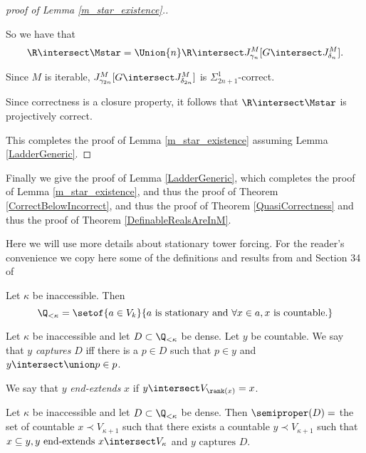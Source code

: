 \documentclass[oneside,12pt]{amsart}
\begin{document}
\begin{proof}[proof of Lemma \ref{m_star_existence}.]
\begin{subproof}
So we have that
$$\R\intersect \Mstar =  \Union{n} \R\intersect J^M_{\gamma_n}[G\intersect J^M_{\delta_n}].$$

Since $M$ is iterable, $J^M_{\gamma_{2n}}[G\intersect J^M_{\delta_{2n}}]$ is
$\Sigma^1_{2n+1}$-correct.

Since correctness is a closure property, it follows that
$\R\intersect\Mstar$ is projectively correct.
\end{subproof}


This completes the proof of Lemma \ref{m_star_existence} assuming Lemma
\ref{LadderGeneric}.

\end{proof}

Finally we give the proof of Lemma \ref{LadderGeneric}, which completes the
proof of Lemma \ref{m_star_existence}, and thus the proof of
Theorem \ref{CorrectBelowIncorrect}, and thus the proof of
Theorem \ref{QuasiCorrectness} and thus the proof of Theorem \ref{DefinableRealsAreInM}.

Here we will use more details about stationary tower forcing.
For the reader's convenience we copy here some of the definitions and results from 
\cite{Larson_Book} and Section 34 of \cite{Jech_Book2} 

\begin{definition}
Let $\kappa$ be inaccessible. Then
$$\Q_{<\kappa}=\setof{a\in V_k}{a \text{ is stationary and } \forall x \in a, x \text{ is countable.}}$$
\end{definition}


\begin{definition}
Let $\kappa$ be inaccessible and let $D\subset\Q_{<\kappa}$ be dense. Let $y$ be countable.
We say that $y$ \emph{captures} $D$ iff there is a $p\in D$ such that $p\in y$ and $y\intersect\union p \in p$.
\end{definition}

\begin{definition}
We say that $y$ \emph{end-extends} $x$ if $y\intersect V_{\rank(x)} = x$.
\end{definition}

\begin{definition}
Let $\kappa$ be inaccessible and let $D\subset\Q_{<\kappa}$ be dense. Then $\semiproper(D) = $ the set of countable
$x \prec V_{\kappa+1}$ such that there exists a countable
 $y \prec V_{\kappa+1}$ such that $x\subseteq y, y \text{ end-extends } x \intersect V_{\kappa}$ and  $y \text{ captures } D.$
\end{definition}
\end{document}
